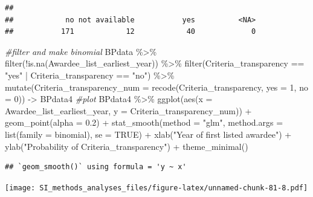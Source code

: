 \documentclass[
]{article}
\newenvironment{Shaded}{\begin{snugshade}}{\end{snugshade}}
\newcommand{\AttributeTok}[1]{\textcolor[rgb]{0.77,0.63,0.00}{#1}}
\newcommand{\CommentTok}[1]{\textcolor[rgb]{0.56,0.35,0.01}{\textit{#1}}}
\newcommand{\ConstantTok}[1]{\textcolor[rgb]{0.00,0.00,0.00}{#1}}
\newcommand{\DecValTok}[1]{\textcolor[rgb]{0.00,0.00,0.81}{#1}}
\newcommand{\FloatTok}[1]{\textcolor[rgb]{0.00,0.00,0.81}{#1}}
\newcommand{\FunctionTok}[1]{\textcolor[rgb]{0.00,0.00,0.00}{#1}}
\newcommand{\NormalTok}[1]{#1}
\newcommand{\OtherTok}[1]{\textcolor[rgb]{0.56,0.35,0.01}{#1}}
\newcommand{\SpecialCharTok}[1]{\textcolor[rgb]{0.00,0.00,0.00}{#1}}
\newcommand{\StringTok}[1]{\textcolor[rgb]{0.31,0.60,0.02}{#1}}
\begin{document}
\begin{verbatim}
## 
##            no not available           yes          <NA> 
##           171            12            40             0
\end{verbatim}

\begin{Shaded}
\begin{Highlighting}[]
\CommentTok{\#filter and make binomial }
\NormalTok{BPdata }\SpecialCharTok{\%\textgreater{}\%} 
\FunctionTok{filter}\NormalTok{(}\SpecialCharTok{!}\FunctionTok{is.na}\NormalTok{(Awardee\_list\_earliest\_year)) }\SpecialCharTok{\%\textgreater{}\%} 
  \FunctionTok{filter}\NormalTok{(Criteria\_transparency }\SpecialCharTok{==} \StringTok{"yes"} \SpecialCharTok{|}\NormalTok{ Criteria\_transparency }\SpecialCharTok{==} \StringTok{"no"}\NormalTok{) }\SpecialCharTok{\%\textgreater{}\%}  
  \FunctionTok{mutate}\NormalTok{(}\AttributeTok{Criteria\_transparency\_num =} \FunctionTok{recode}\NormalTok{(Criteria\_transparency, }\AttributeTok{yes =} \DecValTok{1}\NormalTok{, }\AttributeTok{no =} \DecValTok{0}\NormalTok{)) }\OtherTok{{-}\textgreater{}}\NormalTok{ BPdata4}
\CommentTok{\#plot}
\NormalTok{BPdata4 }\SpecialCharTok{\%\textgreater{}\%} 
  \FunctionTok{ggplot}\NormalTok{(}\FunctionTok{aes}\NormalTok{(}\AttributeTok{x =}\NormalTok{ Awardee\_list\_earliest\_year, }\AttributeTok{y =}\NormalTok{ Criteria\_transparency\_num)) }\SpecialCharTok{+} 
  \FunctionTok{geom\_point}\NormalTok{(}\AttributeTok{alpha =} \FloatTok{0.2}\NormalTok{) }\SpecialCharTok{+} 
  \FunctionTok{stat\_smooth}\NormalTok{(}\AttributeTok{method =} \StringTok{"glm"}\NormalTok{, }\AttributeTok{method.args =} \FunctionTok{list}\NormalTok{(}\AttributeTok{family =}\NormalTok{ binomial), }\AttributeTok{se =} \ConstantTok{TRUE}\NormalTok{) }\SpecialCharTok{+}
  \FunctionTok{xlab}\NormalTok{(}\StringTok{"Year of first listed awardee"}\NormalTok{) }\SpecialCharTok{+} 
  \FunctionTok{ylab}\NormalTok{(}\StringTok{"Probability of Criteria\_transparency"}\NormalTok{) }\SpecialCharTok{+}
  \FunctionTok{theme\_minimal}\NormalTok{()}
\end{Highlighting}
\end{Shaded}

\begin{verbatim}
## `geom_smooth()` using formula = 'y ~ x'
\end{verbatim}

\texttt{[image: SI\_methods\_analyses\_files/figure-latex/unnamed-chunk-81-8.pdf]}
\end{document}
